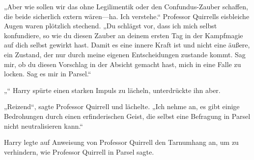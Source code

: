 „Aber wie sollen wir das ohne Legilimentik oder den Confundus-Zauber schaffen, die beide sicherlich extern wären—ha. Ich verstehe.“
Professor Quirrells eisbleiche Augen waren plötzlich stechend.
„Du schlägst vor, dass ich mich selbst konfundiere, so wie du diesen Zauber an deinem ersten Tag in der Kampfmagie auf dich selbst gewirkt hast. Damit es eine innere Kraft ist und nicht eine äußere, ein Zustand, der nur durch meine eigenen Entscheidungen zustande kommt. Sag mir, ob du diesen Vorschlag in der Absicht gemacht hast, mich in eine Falle zu locken. Sag es mir in Parsel.“

„“
Harry spürte einen starken Impuls zu lächeln, unterdrückte ihn aber.

„Reizend“, sagte Professor Quirrell und lächelte.
„Ich nehme an, es gibt einige Bedrohungen durch einen erfinderischen Geist, die selbst eine Befragung in Parsel nicht neutralisieren kann.“

\later

Harry legte auf Anweisung von Professor Quirrell den Tarnumhang an, um zu verhindern,  wie Professor Quirrell in Parsel sagte.


